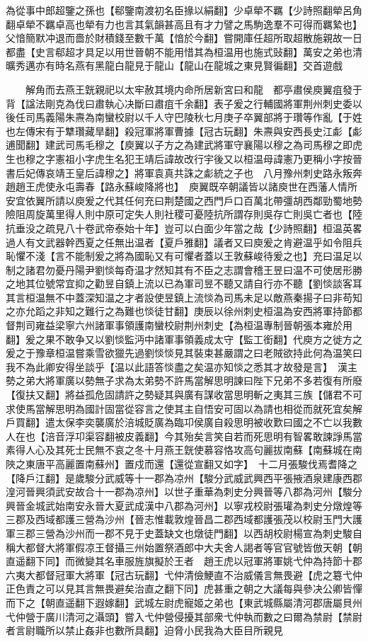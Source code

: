 為從事中郎超鑒之孫也【郗鑒南渡初名臣掾以絹翻】少卓犖不羈【少詩照翻犖呂角翻卓犖不羈卓高也犖有力也言其氣韻甚高且有才力譬之馬駒逸羣不可得而羈縶也】父愔簡默冲退而嗇於財積錢至數千萬【愔於今翻】嘗開庫任超所取超散施親故一日都盡【史言郗超才具足以用世晉朝不能用惜其為桓温用也施式䜴翻】萬安之弟也清曠秀邁亦有時名燕有黑龍白龍見于龍山【龍山在龍城之東見賢徧翻】交首遊戲

　　解角而去燕王皝親祀以太牢赦其境内命所居新宮曰和龍　都亭肅侯庾翼疽發于背【諡法剛克為伐曰肅執心决斷曰肅疽千余翻】表子爰之行輔國將軍荆州刺史委以後任司馬義陽朱燾為南蠻校尉以千人守巴陵秋七月庚子卒翼部將于瓚等作亂【于姓也左傳宋有于犨瓚藏旱翻】殺冠軍將軍曹據【冠古玩翻】朱燾與安西長史江虨【虨逋聞翻】建武司馬毛穆之【庾翼以子方之為建武將軍守襄陽以穆之為司馬穆之即虎生也穆之字憲祖小字虎生名犯王靖后諱故改行宇後又以桓温母諱憲乃更稱小字按晉書后妃傳哀靖王皇后諱穆之】將軍袁真共誅之虨統之子也　八月豫州刺史路永叛奔趙趙王虎使永屯壽春【路永蘇峻降將也】　庾翼既卒朝議皆以諸庾世在西藩人情所安宜依翼所請以庾爰之代其任何充曰荆楚國之西門戶口百萬北帶彊胡西鄰勁蜀地勢險阻周旋萬里得人則中原可定失人則社稷可憂陸抗所謂存則吳存亡則吳亡者也【陸抗垂没之疏見八十卷武帝泰始十年】豈可以白面少年當之哉【少詩照翻】桓温英畧過人有文武器幹西夏之任無出温者【夏戶雅翻】議者又曰庾爰之肯避温乎如令阻兵恥懼不淺【言不能制爰之將為國恥又有可懼者蓋以王敦蘇峻待爰之也】充曰温足以制之諸君勿憂丹陽尹劉惔每奇温才然知其有不臣之志謂會稽王昱曰温不可使居形勝之地其位號常宜抑之勸昱自鎮上流以已為軍司昱不聽又請自行亦不聽【劉惔談客耳其言桓温無不中蓋深知温之才者設使昱鎮上流惔為司馬未足以敵燕秦揚子曰非苟知之亦允蹈之非知之難行之為難也惔徒甘翻】庚辰以徐州刺史桓温為安西將軍持節都督荆司雍益梁寧六州諸軍事領護南蠻校尉荆州刺史【為桓温專制晉朝張本雍於用翻】爰之果不敢争又以劉惔監沔中諸軍事領義成太守【監工銜翻】代庾方之徙方之爰之于豫章桓温嘗乘雪欲獵先過劉惔惔見其裝束甚嚴謂之曰老賊欲持此何為温笑曰我不為此卿安得坐談乎【温以此語答惔盡之矣温亦知惔之悉其才故發是言】　漢主勢之弟大將軍廣以勢無子求為太弟勢不許馬當解思明諫曰陛下兄弟不多若復有所廢【復扶又翻】將益孤危固請許之勢疑其與廣有謀收當思明斬之夷其三族【儲君不可求使馬當解思明為國計固當從容言之使其主自悟安可固以為請也相從而就死宜矣解戶買翻】遣太保李奕襲廣於涪城貶廣為臨卭侯廣自殺思明被收歎曰國之不亡以我數人在也【涪音浮卭渠容翻被皮義翻】今其殆矣言笑自若而死思明有智畧敢諫諍馬當素得人心及其死士民無不哀之冬十月燕王皝使慕容恪攻高句麗拔南蘇【南蘇城在南陜之東唐平高麗置南蘇州】置戍而還【還從宣翻又如字】　十二月張駿伐焉耆降之【降戶江翻】是歲駿分武威等十一郡為凉州【駿分武威武興西平張掖酒泉建康西郡湟河晉興須武安故合十一郡為凉州】以世子重華為刺史分興晉等八郡為河州【駿分興晉金城武始南安永晉大夏武成漢中八郡為河州】以寧戎校尉張瓘為刺史分燉煌等三郡及西域都護三營為沙州【晉志惟載敦煌晉昌二郡西域都護張茂以校尉玉門大護軍三郡三營為沙州而一郡不見于史蓋缺文也燉徒門翻】以西胡校尉楊宣為刺史駿自稱大都督大將軍假凉王督攝三州始置祭酒郎中大夫舍人謁者等官官號皆倣天朝【朝直遥翻下同】而微變其名車服旌旗擬於王者　趙王虎以冠軍將軍姚弋仲為持節十郡六夷大都督冠軍大將軍【冠古玩翻】弋仲清儉鯁直不治威儀言無畏避【虎之簒弋仲正色責之可以見其言無畏避矣治直之翻下同】虎甚重之朝之大議每與參决公卿皆憚而下之【朝直遥翻下遐嫁翻】武城左尉虎寵姬之弟也【東武城縣屬清河郡唐屬貝州弋仲營于廣川清河之灄頭】嘗入弋仲營侵擾其部衆弋仲執而數之曰爾為禁尉【禁尉者言尉職所以禁止姦非也數所具翻】迫脅小民我為大臣目所親見